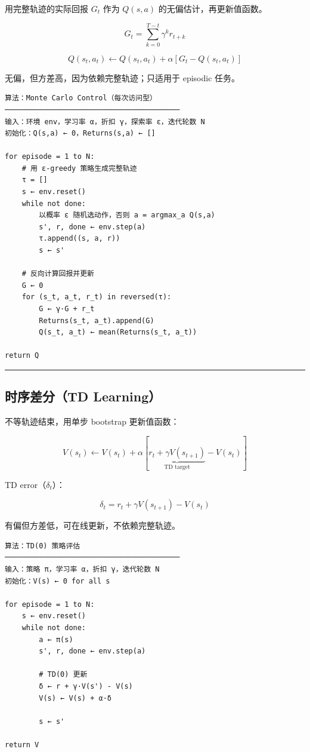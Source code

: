 用完整轨迹的实际回报 \(G_t\) 作为 \(Q(s,a)\) 的无偏估计，再更新值函数。

\[
G_t = \sum_{k=0}^{T-t} \gamma^k r_{t+k}
\]

\[
Q(s_t, a_t) \leftarrow Q(s_t, a_t) + \alpha\left[G_t - Q(s_t, a_t)\right]
\]

无偏，但方差高，因为依赖完整轨迹；只适用于 episodic 任务。

\begin{verbatim}
算法：Monte Carlo Control（每次访问型）
─────────────────────────────────────────
输入：环境 env，学习率 α，折扣 γ，探索率 ε，迭代轮数 N
初始化：Q(s,a) ← 0，Returns(s,a) ← []

for episode = 1 to N:
    # 用 ε-greedy 策略生成完整轨迹
    τ = []
    s ← env.reset()
    while not done:
        以概率 ε 随机选动作，否则 a = argmax_a Q(s,a)
        s', r, done ← env.step(a)
        τ.append((s, a, r))
        s ← s'

    # 反向计算回报并更新
    G ← 0
    for (s_t, a_t, r_t) in reversed(τ):
        G ← γ·G + r_t
        Returns(s_t, a_t).append(G)
        Q(s_t, a_t) ← mean(Returns(s_t, a_t))

return Q
\end{verbatim}

\hrule

\subsection{时序差分（TD Learning）}

不等轨迹结束，用单步 bootstrap 更新值函数：

\[
V(s_t) \leftarrow V(s_t) + \alpha\left[\underbrace{r_t + \gamma V(s_{t+1})}_{\text{TD target}} - V(s_t)\right]
\]

TD error（\(\delta_t\)）：

\[
\delta_t = r_t + \gamma V(s_{t+1}) - V(s_t)
\]

有偏但方差低，可在线更新，不依赖完整轨迹。

\begin{verbatim}
算法：TD(0) 策略评估
─────────────────────────────────────────
输入：策略 π，学习率 α，折扣 γ，迭代轮数 N
初始化：V(s) ← 0 for all s

for episode = 1 to N:
    s ← env.reset()
    while not done:
        a ← π(s)
        s', r, done ← env.step(a)
        
        # TD(0) 更新
        δ ← r + γ·V(s') - V(s)
        V(s) ← V(s) + α·δ
        
        s ← s'

return V
\end{verbatim}

